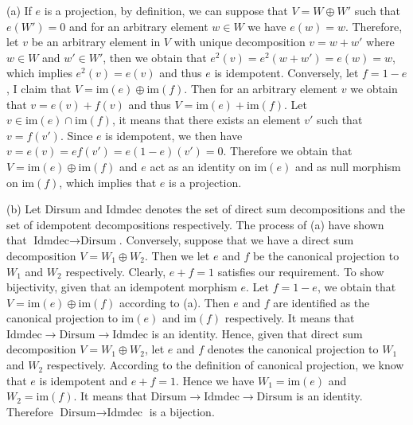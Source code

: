 \begin{solution}
    (a) If $e$ is a projection, by definition, we can suppose that $V=W\oplus W'$ such that $e(W')=0$ and for an arbitrary element $w\in W$ we have $e(w)=w$.
    Therefore, let $v$ be an arbitrary element in $V$ with unique decomposition $v=w+w'$ where $w\in W$ and $w'\in W'$, then we obtain that $e^2(v)=e^2(w+w')=e(w)=w$, which implies $e^2(v)=e(v)$ and thus $e$ is idempotent.
    Conversely, let $f=1-e$, I claim that $V=\text{im}(e)\oplus \text{im}(f)$. Then for an arbitrary element $v$ we obtain that $v=e(v)+f(v)$ and thus $V=\text{im}(e)+\text{im}(f)$.
    Let $v\in\text{im}(e)\cap \text{im}(f)$, it means that there exists an element $v'$ such that $v=f(v')$. Since $e$ is idempotent, we then have $v=e(v)=ef(v')=e(1-e)(v')=0$. Therefore we obtain that $V=\text{im}(e)\oplus\text{im}(f)$
    and $e$ act as an identity on $\text{im}(e)$ and as null morphism on $\text{im}(f)$, which implies that $e$ is a projection.

    (b) Let Dirsum and Idmdec denotes the set of direct sum decompositions and the set of idempotent decompositions respectively.
    The process of (a) have shown that $\text{Idmdec}\to \text{Dirsum}$. Conversely, suppose that we have a direct sum decomposition $V=W_1\oplus W_2$. 
    Then we let $e$ and $f$ be the canonical projection to $W_1$ and $W_2$ respectively. Clearly, $e+f=1$ satisfies our requirement.
    To show bijectivity, given that an idempotent morphism $e$. Let $f=1-e$, we obtain that $V=\text{im}(e)\oplus \text{im}(f)$ according to (a).
    Then $e$ and $f$ are identified as the canonical projection to $\text{im}(e)$ and $\text{im}(f)$ respectively. It means that $\text{Idmdec}\to \text{Dirsum}\to \text{Idmdec}$ is an identity.
    Hence, given that direct sum decomposition $V=W_1\oplus W_2$, let $e$ and $f$ denotes the canonical projection to $W_1$ and $W_2$ respectively.
    According to the definition of canonical projection, we know that $e$ is idempotent and $e+f=1$. 
    Hence we have $W_1=\text{im}(e)$ and $W_2=\text{im}(f)$.
    It means that $\text{Dirsum}\to \text{Idmdec}\to \text{Dirsum}$ is an identity.
    Therefore $\text{Dirsum}\to \text{Idmdec}$ is a bijection.


\end{solution}
